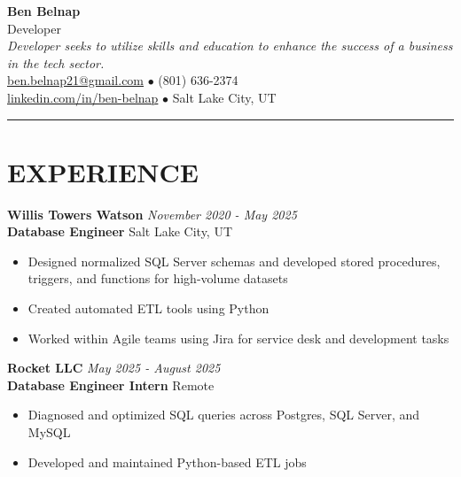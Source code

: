 \documentclass[11pt]{article}
\begin{document}
\begin{minipage}[t]{0.65\textwidth}
    {\Huge\color{primary}\textbf{Ben Belnap}}\\[6pt]
    {\Large\color{subtitle}Developer}\\[12pt]
    
    \textit{Developer seeks to utilize skills and education to enhance the success of a business in the tech sector.}\\[8pt]
    
    {\color{contact}
    \href{mailto:ben.belnap21@gmail.com}{ben.belnap21@gmail.com} $\bullet$ 
    (801) 636-2374\\
    \href{https://www.linkedin.com/in/ben-belnap}{linkedin.com/in/ben-belnap} $\bullet$ 
    Salt Lake City, UT
    }
\end{minipage}%

\vspace{12pt}
{\color{accent}\rule{\textwidth}{1pt}}

\section*{{\color{accent}EXPERIENCE}}

\textbf{Willis Towers Watson} \hfill \textit{November 2020 - May 2025}\\
\textbf{Database Engineer} \hfill Salt Lake City, UT
\begin{itemize}
    \item Designed normalized SQL Server schemas and developed stored procedures, triggers, and functions for high-volume datasets
    \item Created automated ETL tools using Python
    \item Worked within Agile teams using Jira for service desk and development tasks
\end{itemize}

\textbf{Rocket LLC} \hfill \textit{May 2025 - August 2025}\\
\textbf{Database Engineer Intern} \hfill Remote
\begin{itemize}
    \item Diagnosed and optimized SQL queries across Postgres, SQL Server, and MySQL
    \item Developed and maintained Python-based ETL jobs
\end{itemize}
\end{document}
